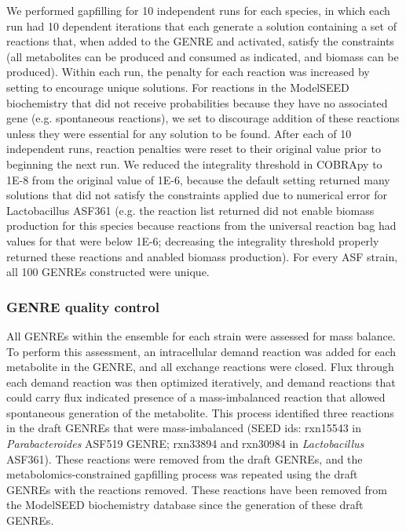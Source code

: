 \documentclass[11pt,twocolumn,notitlepage,openany,twoside]{book}
\begin{document}
\begin{refsection}
We performed gapfilling for 10 independent runs for each species, in which each run had 10 dependent iterations that each generate a solution containing a set of reactions that, when added to the GENRE and activated, satisfy the constraints (all metabolites can be produced and consumed as indicated, and biomass can be produced). Within each run, the penalty for each reaction was increased by setting  to encourage unique solutions. For reactions in the ModelSEED biochemistry that did not receive probabilities because they have no associated gene (e.g. spontaneous reactions), we set  to discourage addition of these reactions unless they were essential for any solution to be found. After each of 10 independent runs, reaction penalties were reset to their original value prior to beginning the next run. We reduced the integrality threshold in COBRApy to 1E-8 from the original value of 1E-6, because the default setting returned many solutions that did not satisfy the constraints applied due to numerical error for Lactobacillus ASF361 (e.g. the reaction list returned did not enable biomass production for this species because reactions from the universal reaction bag had values for  that were below 1E-6; decreasing the integrality threshold properly returned these reactions and anabled biomass production). For every ASF strain, all 100 GENREs constructed were unique.

\subsubsection{GENRE quality control}

All GENREs within the ensemble for each strain were assessed for mass balance. To perform this assessment, an intracellular demand reaction was added for each metabolite in the GENRE, and all exchange reactions were closed. Flux through each demand reaction was then optimized iteratively, and demand reactions that could carry flux indicated presence of a mass-imbalanced reaction that allowed spontaneous generation of the metabolite. This process identified three reactions in the draft GENREs that were mass-imbalanced (SEED ids: rxn15543 in \textit{Parabacteroides} ASF519 GENRE; rxn33894 and rxn30984 in \textit{Lactobacillus} ASF361). These reactions were removed from the draft GENREs, and the metabolomics-constrained gapfilling process was repeated using the draft GENREs with the reactions removed. These reactions have been removed from the ModelSEED biochemistry database since the generation of these draft GENREs.


\end{refsection}
\end{document}
